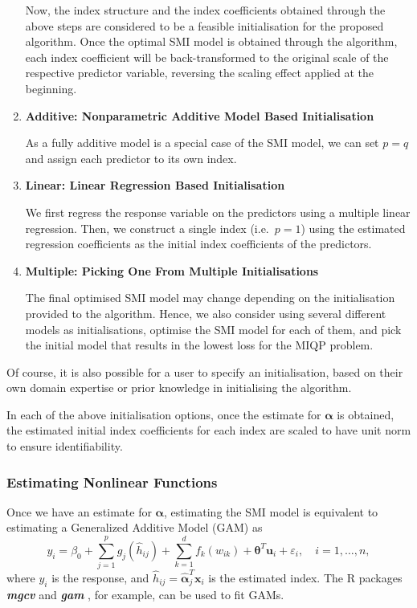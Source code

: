 \documentclass[
  11pt,
  a4paper,
]{article}
\begin{document}
\begin{enumerate}
  Now, the index structure and the index coefficients obtained through
  the above steps are considered to be a feasible initialisation for the
  proposed algorithm. Once the optimal SMI model is obtained through the
  algorithm, each index coefficient will be back-transformed to the
  original scale of the respective predictor variable, reversing the
  scaling effect applied at the beginning.
\item
  \textbf{Additive: Nonparametric Additive Model Based Initialisation}

  As a fully additive model is a special case of the SMI model, we can
  set \(p=q\) and assign each predictor to its own index.
\item
  \textbf{Linear: Linear Regression Based Initialisation}

  We first regress the response variable on the predictors using a
  multiple linear regression. Then, we construct a single index
  (i.e.~\(p = 1\)) using the estimated regression coefficients as the
  initial index coefficients of the predictors.
\item
  \textbf{Multiple: Picking One From Multiple Initialisations}

  The final optimised SMI model may change depending on the
  initialisation provided to the algorithm. Hence, we also consider
  using several different models as initialisations, optimise the SMI
  model for each of them, and pick the initial model that results in the
  lowest loss for the MIQP problem.
\end{enumerate}

Of course, it is also possible for a user to specify an initialisation,
based on their own domain expertise or prior knowledge in initialising
the algorithm.

In each of the above initialisation options, once the estimate for
\(\bm{\alpha}\) is obtained, the estimated initial index coefficients
for each index are scaled to have unit norm to ensure identifiability.

\subsubsection{Estimating Nonlinear Functions}\label{sec-step2}

Once we have an estimate for \(\bm{\alpha}\), estimating the SMI model
is equivalent to estimating a Generalized Additive Model (GAM) as \[
  y_{i} = \beta_{0} + \sum_{j = 1}^{p}g_{j}(\hat{h}_{ij}) + \sum_{k = 1}^{d}f_{k}(w_{ik}) + \bm{\theta}^{T}\bm{u}_{i} + \varepsilon_{i}, \quad i = 1, \dots, n,
\] where \(y_{i}\) is the response, and
\(\hat{h}_{ij} = \hat{\bm{\alpha}}_{j}^{T}\bm{x}_{i}\) is the estimated
index. The R packages \textbf{\emph{mgcv}} \autocite{Wood2011} and
\textbf{\emph{gam}} \autocite{Hastie2023}, for example, can be used to
fit GAMs.
\end{document}

